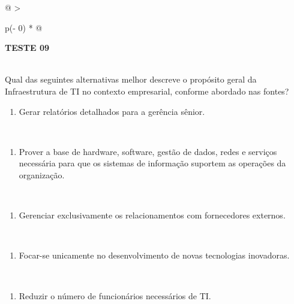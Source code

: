 \documentclass[
]{book}
\providecommand{\tightlist}{%
  \setlength{\itemsep}{0pt}\setlength{\parskip}{0pt}}
\begin{document}
\begin{longtable}[]{@{}
  >{\raggedright\arraybackslash}p{(\columnwidth - 0\tabcolsep) * }@{}}
\toprule\noalign{}
\begin{minipage}[b]{\linewidth}\raggedright
\textbf{TESTE 09}
\end{minipage} \\
\midrule\noalign{}
\endhead
\bottomrule\noalign{}
\endlastfoot
Qual das seguintes alternativas melhor descreve o propósito geral da Infraestrutura de TI no contexto empresarial, conforme abordado nas fontes? \\
\begin{minipage}[t]{\linewidth}\raggedright
\begin{enumerate}
\def\labelenumi{\Alph{enumi})}
\tightlist
\item
  Gerar relatórios detalhados para a gerência sênior.
\end{enumerate}
\end{minipage} \\
\begin{minipage}[t]{\linewidth}\raggedright
\begin{enumerate}
\def\labelenumi{\Alph{enumi})}
\setcounter{enumi}{1}
\tightlist
\item
  Prover a base de hardware, software, gestão de dados, redes e serviços necessária para que os sistemas de informação suportem as operações da organização.
\end{enumerate}
\end{minipage} \\
\begin{minipage}[t]{\linewidth}\raggedright
\begin{enumerate}
\def\labelenumi{\Alph{enumi})}
\setcounter{enumi}{2}
\tightlist
\item
  Gerenciar exclusivamente os relacionamentos com fornecedores externos.
\end{enumerate}
\end{minipage} \\
\begin{minipage}[t]{\linewidth}\raggedright
\begin{enumerate}
\def\labelenumi{\Alph{enumi})}
\setcounter{enumi}{3}
\tightlist
\item
  Focar-se unicamente no desenvolvimento de novas tecnologias inovadoras.
\end{enumerate}
\end{minipage} \\
\begin{minipage}[t]{\linewidth}\raggedright
\begin{enumerate}
\def\labelenumi{\Alph{enumi})}
\setcounter{enumi}{4}
\tightlist
\item
  Reduzir o número de funcionários necessários de TI.
\end{enumerate}
\end{minipage} \\
\end{longtable}
\end{document}
